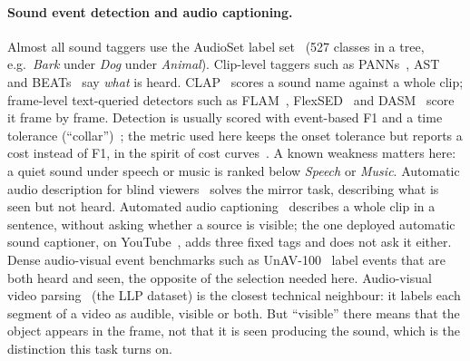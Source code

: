 \paragraph{Sound event detection and audio captioning.} Almost all sound taggers use the AudioSet label
set~\cite{gemmeke2017audioset} (527 classes in a tree, e.g.\ \emph{Bark} under \emph{Dog} under \emph{Animal}).
Clip-level taggers such as PANNs~\cite{kong2020panns}, AST~\cite{gong2021ast} and BEATs~\cite{chen2023beats} say
\emph{what} is heard. CLAP~\cite{elizalde2023clap} scores a sound name against a whole clip; frame-level text-queried
detectors such as FLAM~\cite{wu2025flam}, FlexSED~\cite{hai2025flexsed} and DASM~\cite{cai2025dasm} score it frame by
frame. Detection is usually
scored with event-based F1 and a time tolerance (``collar'')~\cite{mesaros2016metrics,bilen2020psds}; the metric used
here keeps the onset tolerance but reports a cost instead of F1, in the spirit of cost curves~\cite{drummond2006costcurves}.
A known weakness matters here: a quiet sound under speech or music is ranked below \emph{Speech} or \emph{Music}.
Automatic audio description for blind viewers~\cite{han2023autoad} solves the mirror task, describing what is seen
but not heard. Automated audio captioning~\cite{drossos2017aac,kim2019audiocaps,drossos2020clotho} describes a whole clip in a
sentence, without asking whether a source is visible; the one deployed automatic sound captioner, on
YouTube~\cite{chaudhuri2017youtube}, adds three fixed tags and does not ask it either. Dense audio-visual event benchmarks such as
UnAV-100~\cite{geng2023unav100} label events that are both heard and seen, the opposite of the selection needed here.
Audio-visual video parsing~\cite{tian2020avvp} (the LLP dataset) is the closest technical neighbour: it labels each segment of a video as
audible, visible or both. But ``visible'' there means that the object appears in the frame, not that it is seen
producing the sound, which is the distinction this task turns on.

